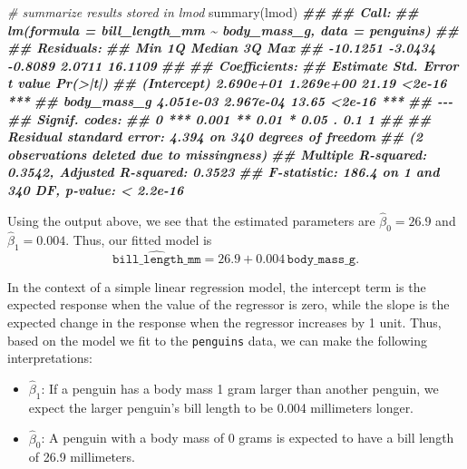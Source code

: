 \documentclass[
]{book}
\newenvironment{Shaded}{\begin{snugshade}}{\end{snugshade}}
\newcommand{\CommentTok}[1]{\textcolor[rgb]{0.56,0.35,0.01}{\textit{#1}}}
\newcommand{\DocumentationTok}[1]{\textcolor[rgb]{0.56,0.35,0.01}{\textbf{\textit{#1}}}}
\newcommand{\FunctionTok}[1]{\textcolor[rgb]{0.00,0.00,0.00}{#1}}
\newcommand{\NormalTok}[1]{#1}
\providecommand{\tightlist}{%
  \setlength{\itemsep}{0pt}\setlength{\parskip}{0pt}}
\theoremstyle{definition}
\theoremstyle{definition}
\theoremstyle{definition}
\theoremstyle{definition}
\theoremstyle{remark}
\begin{document}
\begin{Shaded}
\begin{Highlighting}[]
\CommentTok{\# summarize results stored in lmod}
\FunctionTok{summary}\NormalTok{(lmod)}
\DocumentationTok{\#\# }
\DocumentationTok{\#\# Call:}
\DocumentationTok{\#\# lm(formula = bill\_length\_mm \textasciitilde{} body\_mass\_g, data = penguins)}
\DocumentationTok{\#\# }
\DocumentationTok{\#\# Residuals:}
\DocumentationTok{\#\#      Min       1Q   Median       3Q      Max }
\DocumentationTok{\#\# {-}10.1251  {-}3.0434  {-}0.8089   2.0711  16.1109 }
\DocumentationTok{\#\# }
\DocumentationTok{\#\# Coefficients:}
\DocumentationTok{\#\#              Estimate Std. Error t value Pr(\textgreater{}|t|)    }
\DocumentationTok{\#\# (Intercept) 2.690e+01  1.269e+00   21.19   \textless{}2e{-}16 ***}
\DocumentationTok{\#\# body\_mass\_g 4.051e{-}03  2.967e{-}04   13.65   \textless{}2e{-}16 ***}
\DocumentationTok{\#\# {-}{-}{-}}
\DocumentationTok{\#\# Signif. codes:  }
\DocumentationTok{\#\# 0 \textquotesingle{}***\textquotesingle{} 0.001 \textquotesingle{}**\textquotesingle{} 0.01 \textquotesingle{}*\textquotesingle{} 0.05 \textquotesingle{}.\textquotesingle{} 0.1 \textquotesingle{} \textquotesingle{} 1}
\DocumentationTok{\#\# }
\DocumentationTok{\#\# Residual standard error: 4.394 on 340 degrees of freedom}
\DocumentationTok{\#\#   (2 observations deleted due to missingness)}
\DocumentationTok{\#\# Multiple R{-}squared:  0.3542, Adjusted R{-}squared:  0.3523 }
\DocumentationTok{\#\# F{-}statistic: 186.4 on 1 and 340 DF,  p{-}value: \textless{} 2.2e{-}16}
\end{Highlighting}
\end{Shaded}

Using the output above, we see that the estimated parameters are \(\hat{\beta}_0=26.9\) and \(\hat{\beta}_1=0.004\). Thus, our fitted model is
\[
\widehat{\mathtt{bill\_length\_mm}}=26.9+0.004 \,\mathtt{body\_mass\_g}.
\]

In the context of a simple linear regression model, the intercept term is the expected response when the value of the regressor is zero, while the slope is the expected change in the response when the regressor increases by 1 unit. Thus, based on the model we fit to the \texttt{penguins} data, we can make the following interpretations:

\begin{itemize}
\tightlist
\item
  \(\hat{\beta}_1\): If a penguin has a body mass 1 gram larger than another penguin, we expect the larger penguin's bill length to be 0.004 millimeters longer.
\item
  \(\hat{\beta}_0\): A penguin with a body mass of 0 grams is expected to have a bill length of 26.9 millimeters.
\end{itemize}
\end{document}
